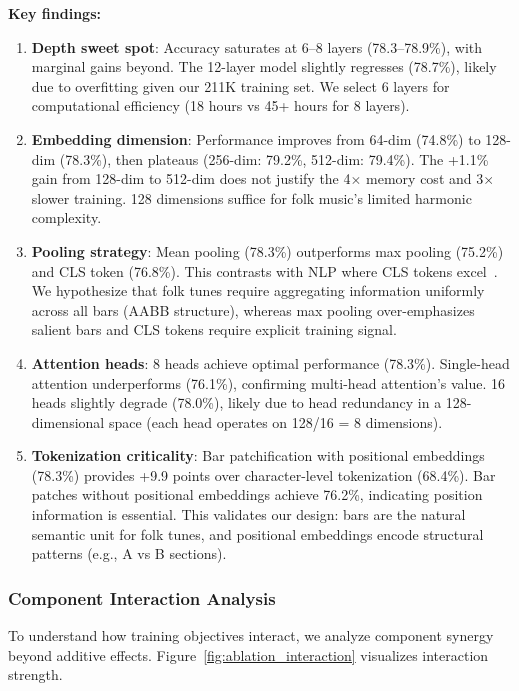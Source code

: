 \documentclass[]{interact}
\theoremstyle{plain}
\theoremstyle{definition}
\theoremstyle{remark}
\begin{document}
\textbf{Key findings:}

\begin{enumerate}
\item \textbf{Depth sweet spot}: Accuracy saturates at 6--8 layers (78.3--78.9\%), with marginal gains beyond. The 12-layer model slightly regresses (78.7\%), likely due to overfitting given our 211K training set. We select 6 layers for computational efficiency (18 hours vs 45+ hours for 8 layers).

\item \textbf{Embedding dimension}: Performance improves from 64-dim (74.8\%) to 128-dim (78.3\%), then plateaus (256-dim: 79.2\%, 512-dim: 79.4\%). The +1.1\% gain from 128-dim to 512-dim does not justify the 4$\times$ memory cost and 3$\times$ slower training. 128 dimensions suffice for folk music's limited harmonic complexity.

\item \textbf{Pooling strategy}: Mean pooling (78.3\%) outperforms max pooling (75.2\%) and CLS token (76.8\%). This contrasts with NLP where CLS tokens excel~\cite{BERT2019}. We hypothesize that folk tunes require aggregating information uniformly across all bars (AABB structure), whereas max pooling over-emphasizes salient bars and CLS tokens require explicit training signal.

\item \textbf{Attention heads}: 8 heads achieve optimal performance (78.3\%). Single-head attention underperforms (76.1\%), confirming multi-head attention's value. 16 heads slightly degrade (78.0\%), likely due to head redundancy in a 128-dimensional space (each head operates on 128/16 = 8 dimensions).

\item \textbf{Tokenization criticality}: Bar patchification with positional embeddings (78.3\%) provides +9.9 points over character-level tokenization (68.4\%). Bar patches without positional embeddings achieve 76.2\%, indicating position information is essential. This validates our design: bars are the natural semantic unit for folk tunes, and positional embeddings encode structural patterns (e.g., A vs B sections).
\end{enumerate}

\subsubsection{Component Interaction Analysis}

To understand how training objectives interact, we analyze component synergy beyond additive effects. Figure~\ref{fig:ablation_interaction} visualizes interaction strength.
\end{document}
